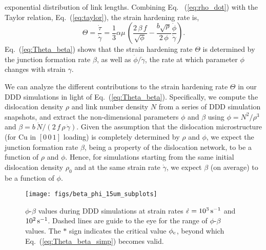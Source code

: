 \documentclass[%
reprint,
 amsmath,amssymb,
 aps,
superscriptaddress,
]{revtex4-1}
\begin{document}
exponential distribution of link lengths.
%
Combining Eq. ~(\ref{eq:rho_dot}) with the Taylor relation,
Eq.~(\ref{eq:taylor}), the strain hardening rate is,
%
\begin{equation}
  \Theta = \frac{\dot{\tau}}{\dot{\gamma}} = \frac{1}{3}\alpha\mu \, \left(
      \frac{2\,\beta\,f}{\sqrt{\phi}}
      - \frac{b\sqrt{\rho}}{2\,\phi} \frac{\dot{\phi}}{\dot{\gamma}} \right).
      \label{eq:Theta_beta}
\end{equation}
%
Eq.~(\ref{eq:Theta_beta}) shows that the strain hardening rate $\Theta$ is
determined by the junction formation rate $\beta$, as well as
$\dot{\phi}/\dot{\gamma}$, the rate at which parameter $\phi$ changes with
strain $\gamma$.

We can analyze the different contributions to the strain hardening rate $\Theta$ 
in our DDD simulations in light of Eq.~(\ref{eq:Theta_beta}).
%
Specifically, we compute the dislocation density $\rho$ and link number density $N$ 
from a series of DDD simulation snapshots, and extract the non-dimensional 
parameters $\phi$ and $\beta$ using
%
$\phi = N^2 / \rho^3$
and $\beta = {b\,\dot{N}}/({2\,f\,\rho\,\dot{\gamma}})$.
%
Given the assumption that the dislocation microstructure (for Cu in $[0\,0\,1]$
loading) is completely determined by $\rho$ and $\phi$, we expect the 
junction formation rate $\beta$, being a property of the dislocation network, to 
be a function of $\rho$ and $\phi$.  
%
Hence, for simulations starting from the same initial dislocation density
$\rho_0$ and at the same strain rate $\dot{\gamma}$, we expect $\beta$
(on average) to be a function of $\phi$.



\begin{figure}
\center
%
 \texttt{[image: figs/beta\_phi\_15um\_subplots]}
%
\caption{\label{fig:beta_phi} $\phi$-$\beta$ values during DDD simulations
at strain rates $\dot{\varepsilon} = 10^3\, {\rm s}^{-1}$ and $10^{2}\,{\rm s}^{-1}$.
%
%
Dashed lines are guide to the eye for the range of $\phi$-$\beta$ values.
%
The $*$ sign indicates the critical value $\phi_{\rm c}$, beyond which
Eq.~(\ref{eq:Theta_beta_simp}) becomes valid.
%
}
%
\end{figure}
\end{document}
